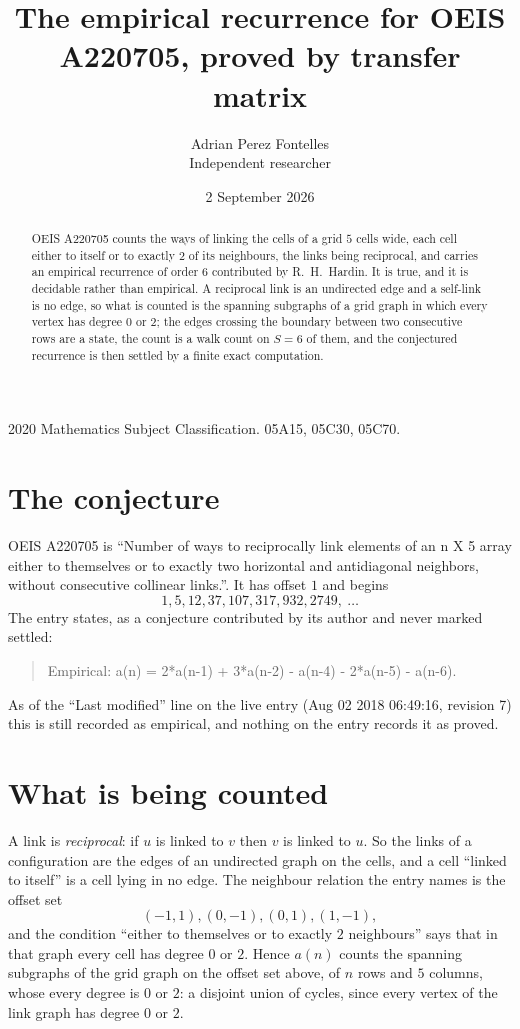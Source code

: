 \documentclass[11pt,a4paper]{article}
\title{The empirical recurrence for OEIS A220705, proved by transfer matrix}
\author{Adrian Perez Fontelles\\ \small Independent researcher}
\date{2 September 2026}
\theoremstyle{plain}
\theoremstyle{definition}
\begin{document}
\maketitle

\begin{abstract}
OEIS A220705 counts the ways of linking the cells of a grid $5$ cells wide, each cell either to
itself or to exactly $2$ of its neighbours, the links being reciprocal, and carries an
empirical recurrence of order $6$ contributed by R.~H.~Hardin. It is true, and it is
decidable rather than empirical. A reciprocal link is an undirected edge and a self-link is
no edge, so what is counted is the spanning subgraphs of a grid graph in which every vertex
has degree $0$ or $2$; the edges crossing the boundary between two consecutive rows are a
state, the count is a walk count on $S=6$ of them, and the conjectured recurrence is then
settled by a finite exact computation.
\end{abstract}

\noindent\small 2020 Mathematics Subject Classification. 05A15, 05C30, 05C70.\normalsize

\section{The conjecture}

OEIS A220705 is ``Number of ways to reciprocally link elements of an n X 5 array either to themselves or to exactly two horizontal and antidiagonal neighbors, without consecutive collinear links.''. It has offset $1$ and begins
\[
1, 5, 12, 37, 107, 317, 932, 2749,\ \dots
\]
The entry states, as a conjecture contributed by its author and never marked settled:
\begin{quote}
Empirical: a(n) = 2*a(n-1) + 3*a(n-2) - a(n-4) - 2*a(n-5) - a(n-6).
\end{quote}
As of the ``Last modified'' line on the live entry (Aug 02 2018 06:49:16, revision 7) this is still
recorded as empirical, and nothing on the entry records it as proved.

\section{What is being counted}

A link is \emph{reciprocal}: if $u$ is linked to $v$ then $v$ is linked to $u$. So the links
of a configuration are the edges of an undirected graph on the cells, and a cell ``linked to
itself'' is a cell lying in no edge. The neighbour relation the entry names is the offset set
\[
(-1,1), (0,-1), (0,1), (1,-1),
\]
and the condition ``either to themselves or to exactly $2$ neighbours'' says that in that
graph every cell has degree $0$ or $2$. Hence $a(n)$ counts the spanning subgraphs of the
grid graph on the offset set above, of $n$ rows and $5$ columns,
whose every degree is $0$ or $2$: a disjoint union of cycles, since every vertex of the link graph has degree $0$ or $2$.
\end{document}
